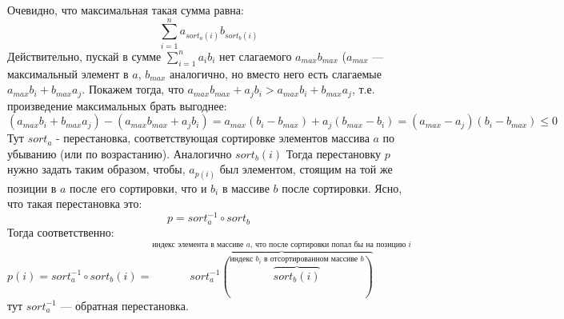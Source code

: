 Очевидно, что максимальная такая сумма равна:
\[\sum_{i=1}^{n}{a_{sort_a(i)}b_{sort_b(i)}}\]
Действительно, пускай в сумме $\sum_{i=1}^{n}{a_ib_i}$ нет слагаемого $a_{max}b_{max}$ ($a_{max}$ --- максимальный элемент в $a$, $b_{max}$ аналогично, но вместо него есть слагаемые $a_{max}b_i + b_{max}a_j$. Покажем тогда, что $a_{max}b_{max}+a_jb_i > a_{max}b_i + b_{max}a_j$, т.е. произведение максимальных брать выгоднее:
\[
	(a_{max}b_i+b_{max}a_j)-(a_{max}b_{max}+a_jb_i) = a_{max}(b_i-b_{max}) + a_j(b_{max}-b_i) = 
	  (a_{max}-a_j)(b_i-b_{max}) \leq 0 
\]
Тут $sort_a$ - перестановка, соответствующая сортировке элементов массива $a$ по убыванию (или по возрастанию). Аналогично $sort_b(i)$
Тогда перестановку $p$ нужно задать таким образом, чтобы, $a_{p(i)}$ был элементом, стоящим на той же позиции в $a$ после его сортировки, что и $b_i$ в массиве $b$ после сортировки. Ясно, что такая перестановка это:
\[p = sort_a^{-1}\circ sort_b\]
Тогда соответственно:
\[p(i) = sort_a^{-1}\circ sort_b(i) = \overbrace{sort_a^{-1}(\overbrace{sort_b(i)}^{\text{индекс } b_i\text{ в отсортированном массиве } b})}^{\text{индекс элемента в массиве } a \text{, что после сортировки попал бы на позицию } i}\]
тут $sort_a^{-1}$ --- обратная перестановка. \xqed


